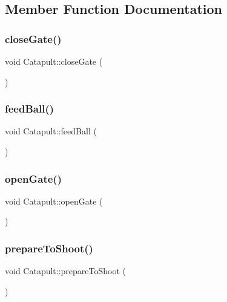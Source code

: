 \subsection{Member Function Documentation}
\mbox{\label{class_catapult_a33ed3abd636cc9cdc267a9d06ef8d1db}} 
\subsubsection{\texorpdfstring{close\+Gate()}{closeGate()}}
{\footnotesize\ttfamily void Catapult\+::close\+Gate (\begin{DoxyParamCaption}{ }\end{DoxyParamCaption})}

\mbox{\label{class_catapult_ab6f3cc1858e28ad31ecc4a26dfc0cd31}} 
\subsubsection{\texorpdfstring{feed\+Ball()}{feedBall()}}
{\footnotesize\ttfamily void Catapult\+::feed\+Ball (\begin{DoxyParamCaption}{ }\end{DoxyParamCaption})}

\mbox{\label{class_catapult_a67141918881d6bf8ddd171dc9eb8d87f}} 
\subsubsection{\texorpdfstring{open\+Gate()}{openGate()}}
{\footnotesize\ttfamily void Catapult\+::open\+Gate (\begin{DoxyParamCaption}{ }\end{DoxyParamCaption})}

\mbox{\label{class_catapult_aad215c7a20a16a76a8cac9b9538a64ed}} 
\subsubsection{\texorpdfstring{prepare\+To\+Shoot()}{prepareToShoot()}}
{\footnotesize\ttfamily void Catapult\+::prepare\+To\+Shoot (\begin{DoxyParamCaption}{ }\end{DoxyParamCaption})}

